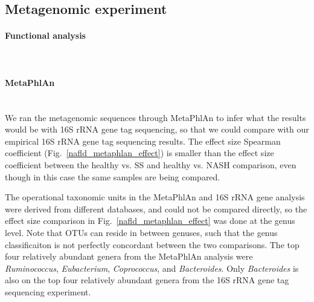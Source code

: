 \FloatBarrier

\subsection{Metagenomic experiment}

\paragraph{Functional analysis}\mbox{}\\


\paragraph{MetaPhlAn}\mbox{}\\
We ran the metagenomic sequences through MetaPhlAn to infer what the results would be with 16S rRNA gene tag sequencing, so that we could compare with our empirical 16S rRNA gene tag sequencing results. The effect size Spearman coefficient (Fig.~\ref{nafld_metaphlan_effect}) is smaller than the effect size coefficient between the healthy vs. SS and healthy vs. NASH comparison, even though in this case the same samples are being compared.

The operational taxonomic units in the MetaPhlAn and 16S rRNA gene analysis were derived from different databases, and could not be compared directly, so the effect size comparison in Fig.~\ref{nafld_metaphlan_effect} was done at the genus level. Note that OTUs can reside in between genuses, such that the genus classificaiton is not perfectly concordant between the two comparisons. The top four relatively abundant genera from the MetaPhlAn analysis were \textit{Ruminococcus}, \textit{Eubacterium}, \textit{Coprococcus}, and \textit{Bacteroides}. Only \textit{Bacteroides} is also on the top four relatively abundant genera from the 16S rRNA gene tag sequencing experiment.


